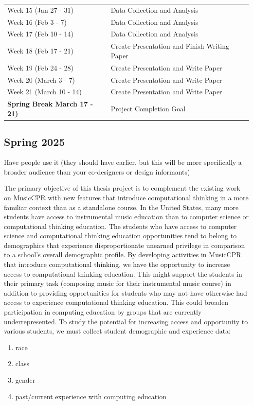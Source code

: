 \documentclass[manuscript,screen,review]{acmart}
\begin{document}
\begin{table}[h]
\begin{tabular}{@{}ll@{}}
Week 15 (Jan 27 - 31) & Data Collection and Analysis       \\
Week 16 (Feb 3 - 7)   & Data Collection and Analysis       \\
Week 17 (Feb 10 - 14) & Data Collection and Analysis       \\ \midrule
Week 18 (Feb 17 - 21) & Create Presentation and Finish Writing Paper \\
Week 19 (Feb 24 - 28) & Create Presentation and Write Paper \\
Week 20 (March 3 - 7) & Create Presentation and Write Paper \\
Week 21 (March 10 - 14) & Create Presentation and Write Paper \\ \midrule
\textbf{Spring Break March 17 - 21)} & Project Completion Goal  \\ \midrule
\end{tabular}
\end{table}




\subsection{Spring 2025}
Have people use it (they should have earlier, but this will be more specifically a broader audience than your co-designers or design informants)

The primary objective of this thesis project is to complement the existing work on MusicCPR with new features that introduce computational thinking in a more familiar context than as a standalone course.
In the United States, many more students have access to instrumental music education than to computer science or computational thinking education.
The students who have access to computer science and computational thinking education opportunities tend to belong to demographics that experience disproportionate unearned privilege in comparison to a school's overall demographic profile.
By developing activities in MusicCPR that introduce computational thinking, we have the opportunity to increase access to computational thinking education.
This might support the students in their primary task (composing music for their instrumental music course) in addition to providing opportunities for students who may not have otherwise had access to experience computational thinking education.
This could broaden participation in computing education by groups that are currently underrepresented.
To study the potential for increasing access and opportunity to various students, we must collect student demographic and experience data:
\begin{enumerate}
    \item race
    \item class
    \item gender
    \item past/current experience with computing education
\end{enumerate}
\end{document}
